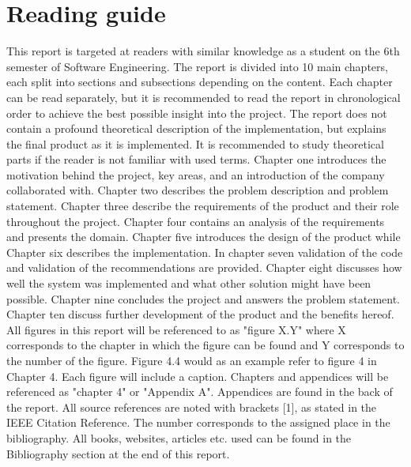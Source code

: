 
\chapter{Reading guide} %

\label{readingGuide} %


This report is targeted at readers with similar knowledge as a student on the 6th semester of
Software Engineering. The report
is divided into 10 main chapters, each split into sections and subsections depending on the content.
Each chapter can be read separately, but it is recommended to read the report in chronological order
to achieve the best possible insight into the project. The report does not contain a profound theoretical
description of the implementation, but explains the final product as it is implemented. It is
recommended to study theoretical parts if the reader is not familiar with used terms.
Chapter one introduces the motivation behind the project, key areas, and an introduction of the company collaborated with. Chapter two describes the problem description and problem statement. Chapter three describe the
requirements of the product and their role throughout the project. Chapter four contains an analysis
of the requirements and presents the domain. Chapter five introduces the design of the
product while Chapter six describes the implementation. In chapter seven validation of the code and validation of the recommendations are provided. Chapter eight discusses how well the system was implemented and what other solution might have been possible. Chapter nine concludes the project and answers the problem statement. Chapter ten discuss further development of the product and the benefits hereof.\\
All figures in this report will be referenced to as "figure X.Y" where X corresponds to the chapter in
which the figure can be found and Y corresponds to the number of the figure. Figure 4.4 would as an
example refer to figure 4 in Chapter 4. Each figure will include a caption. Chapters and appendices will be referenced as "chapter 4" or "Appendix A". Appendices are found in the back of the report.
All source references are noted with brackets [1], as stated in the IEEE Citation Reference. The number
corresponds to the assigned place in the bibliography. All books, websites, articles etc. used can be
found in the Bibliography section at the end of this report.